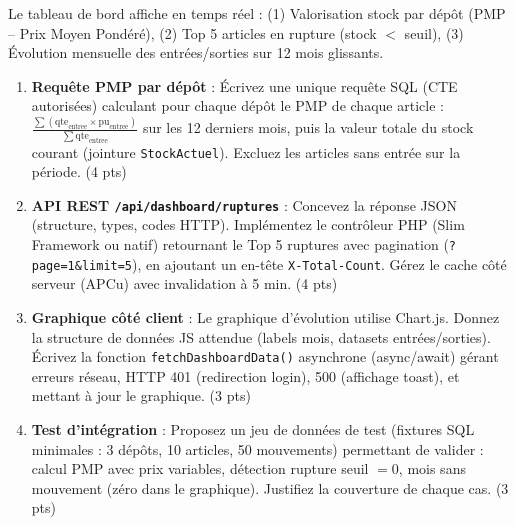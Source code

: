 \documentclass[11pt]{article}
\begin{document}
\begin{exercice}
Le tableau de bord affiche en temps réel : (1) Valorisation stock par dépôt (PMP -- Prix Moyen Pondéré), (2) Top 5 articles en rupture (stock $<$ seuil), (3) Évolution mensuelle des entrées/sorties sur 12 mois glissants.

\begin{enumerate}
    \item \textbf{Requête PMP par dépôt} : Écrivez une unique requête SQL (CTE autorisées) calculant pour chaque dépôt le PMP de chaque article : $\frac{\sum(\text{qte}_\text{entree} \times \text{pu}_\text{entree})}{\sum\text{qte}_\text{entree}}$ sur les 12 derniers mois, puis la valeur totale du stock courant (jointure \texttt{StockActuel}). Excluez les articles sans entrée sur la période. (4 pts)
    \item \textbf{API REST \texttt{/api/dashboard/ruptures}} : Concevez la réponse JSON (structure, types, codes HTTP). Implémentez le contrôleur PHP (Slim Framework ou natif) retournant le Top 5 ruptures avec pagination (\texttt{?page=1\&limit=5}), en ajoutant un en-tête \texttt{X-Total-Count}. Gérez le cache côté serveur (APCu) avec invalidation à 5 min. (4 pts)
    \item \textbf{Graphique côté client} : Le graphique d'évolution utilise Chart.js. Donnez la structure de données JS attendue (labels mois, datasets entrées/sorties). Écrivez la fonction \texttt{fetchDashboardData()} asynchrone (async/await) gérant erreurs réseau, HTTP 401 (redirection login), 500 (affichage toast), et mettant à jour le graphique. (3 pts)
    \item \textbf{Test d'intégration} : Proposez un jeu de données de test (fixtures SQL minimales : 3 dépôts, 10 articles, 50 mouvements) permettant de valider : calcul PMP avec prix variables, détection rupture seuil $=0$, mois sans mouvement (zéro dans le graphique). Justifiez la couverture de chaque cas. (3 pts)
\end{enumerate}
\end{exercice}
\end{document}
